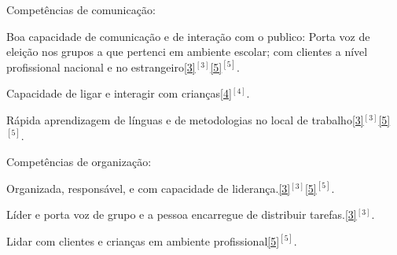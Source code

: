 


\begin{cventries}

  \vspace{0.5cm}
  \cventry
    {Competências de comunicação:} %
    {} 
    {} 
    {} 
    {
      \vspace{0.4cm}
      \begin{cvitems} %
        \item {Boa capacidade de comunicação e de interação com o publico: Porta voz de eleição nos grupos a que pertenci em ambiente escolar; com clientes a nível  profissional nacional e no estrangeiro\ref{3}{$^{[3]}$}\ref{5}{$^{[5]}$}.}
        \item {Capacidade de ligar e interagir com crianças\ref{4}{$^{[4]}$}.}
        \item {Rápida aprendizagem de línguas e de metodologias no local de trabalho\ref{3}{$^{[3]}$}\ref{5}{$^{[5]}$}.} 
      \end{cvitems}
    }  
    
  \cventry
    {Competências de organização:} %
    {} 
    {} 
    {} 
    {
      \vspace{0.4cm} 
      \begin{cvitems} %
        \item {Organizada, responsável, e com capacidade de liderança.\ref{3}{$^{[3]}$}\ref{5}{$^{[5]}$}.} 
        \item {Líder e porta voz de grupo e a pessoa encarregue de distribuir tarefas.\ref{3}{$^{[3]}$}.}
        \item {Lidar com clientes e crianças em ambiente profissional\ref{5}{$^{[5]}$}.}
      \end{cvitems}
    }        
    


\end{cventries}

